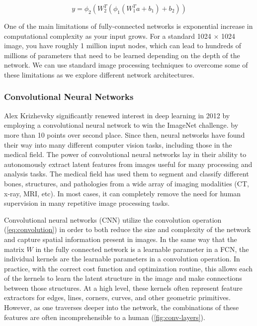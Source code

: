 \begin{equation}
    y = \phi_2 (W_2^{T}(\phi_1(W_1^{T}a + b_1) + b_2))
    \label{eq:2-layer-fcn}
\end{equation}

One of the main limitations of fully-connected networks is exponential increase in computational complexity as your input grows.
For a standard 1024 $\times$ 1024 image, you have roughly 1 million input nodes, which can lead to hundreds of millions of parameters that need to be learned depending on the depth of the network.
We can use standard image processing techniques to overcome some of these limitations as we explore different network architectures.

\subsubsection{Convolutional Neural Networks}

Alex Krizhevsky significantly renewed interest in deep learning in 2012 by employing a convolutional neural network to win the ImageNet challenge. \cite{russakovskyImageNetLargeScale2015} by more than 10 points over second place.
Since then, neural networks have found their way into many different computer vision tasks, including those in the medical field.
The power of convolutional neural networks lay in their ability to autonomously extract latent features from images useful for many processing and analysis tasks.
The medical field has used them to segment and classify different bones, structures, and pathologies from a wide array of imaging modalities (CT, x-ray, MRI, etc).
In most cases, it can completely remove the need for human supervision in many repetitive image processing tasks.

Convolutional neural networks (CNN) utilize the convolution operation (\cref{eq:convolution}) in order to both reduce the size and complexity of the network and capture spatial information present in images.
In the same way that the matrix $W$ in the fully connected network is a learnable parameter in a FCN, the individual kernels are the learnable parameters in a convolution operation.
In practice, with the correct cost function and optimization routine, this allows each of the kernels to learn the latent structure in the image and make connections between those structures.
At a high level, these kernels often represent feature extractors for edges, lines, corners, curves, and other geometric primitives.
However, as one traverses deeper into the network, the combinations of these features are often incomprehensible to a human (\cref{fig:conv-layers}).

